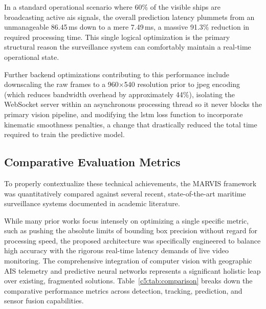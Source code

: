 In a standard operational scenario where 60\% of the visible ships are broadcasting active \gls{ais} signals, the overall prediction latency plummets from an unmanageable 86.45\,ms down to a mere 7.49\,ms, a massive 91.3\% reduction in required processing time. This single logical optimization is the primary structural reason the surveillance system can comfortably maintain a real-time operational state.

Further backend optimizations contributing to this performance include downscaling the raw frames to a 960$\times$540 resolution prior to \gls{jpeg} encoding (which reduces bandwidth overhead by approximately 44\%), isolating the WebSocket server within an asynchronous processing thread so it never blocks the primary vision pipeline, and modifying the \gls{lstm} loss function to incorporate kinematic smoothness penalties, a change that drastically reduced the total time required to train the predictive model.

\subsection{Comparative Evaluation Metrics}


To properly contextualize these technical achievements, the MARVIS framework was quantitatively compared against several recent, state-of-the-art maritime surveillance systems documented in academic literature. 

While many prior works focus intensely on optimizing a single specific metric, such as pushing the absolute limits of bounding box precision without regard for processing speed, the proposed architecture was specifically engineered to balance high accuracy with the rigorous real-time latency demands of live video monitoring. The comprehensive integration of computer vision with geographic AIS telemetry and predictive neural networks represents a significant holistic leap over existing, fragmented solutions. Table~\ref{c5:tab:comparison} breaks down the comparative performance metrics across detection, tracking, prediction, and sensor fusion capabilities.

